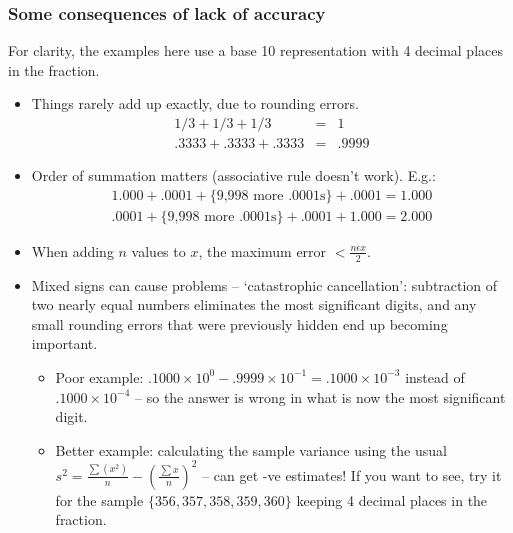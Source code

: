 \documentclass[11pt,a4paper]{article}
\newcommand{\bes}{\begin{eqnarray*}}
\newcommand{\ees}{\end{eqnarray*}}
\begin{document}
\begin{frame}[fragile]
	\frametitle{Some consequences of lack of accuracy}

		For clarity, the examples here use a base 10 representation with 4 decimal places in the fraction.
	
	\begin{itemize}
	    \item <2-> Things rarely add up exactly, due to rounding errors.
	\bes
	    1/3+1/3+1/3 &=& 1 \\
	    .3333 +.3333 + .3333 &=& .9999
	\ees
	    \item <3->Order of summation matters (associative rule doesn't work).  E.g.:
	\bes
	        1.000 + .0001 + \{\mbox{9,998 more .0001s}\} + .0001 = 1.000\\
	        .0001 + \{\mbox{9,998 more .0001s}\} + .0001 + 1.000 = 2.000
	\ees
	    \item <4->When adding $n$ values to $x$, the maximum error $<\frac{n  \epsilon x}{2}$.
	\end{itemize}
\end{frame}
\begin{frame}[fragile]
	\begin{itemize}
	
	    \item Mixed signs can cause problems -- `catastrophic cancellation': subtraction of two nearly equal numbers eliminates the most significant digits, and any small rounding errors that were previously hidden end up becoming important.
	    \begin{itemize}
	        \item <2->Poor example: $.1000 \times 10^0 - .9999 \times 10^{-1} = .1000 \times 10^{-3}$ instead of $.1000 \times 10^{-4}$ -- so the answer is wrong in what is now the most significant digit.
	        \item <3->Better example: calculating the sample variance using the usual $s^2=\frac{\sum{\left(x^2\right)}}{n} - \left(\frac{\sum{x}}{n}\right)^2$ -- can get -ve estimates!  If you want to see, try it for the sample $\{356, 357, 358, 359, 360\}$ keeping 4 decimal places in the fraction.
	
	    \end{itemize}
	\end{itemize}

\end{frame}
\end{document}
